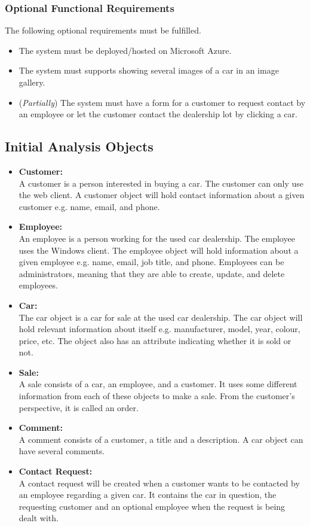 \subsubsection{Optional Functional Requirements}
The following optional requirements must be fulfilled.
\begin{itemize}
	\item The system must be deployed/hosted on Microsoft Azure.
	\item The system must supports showing several images of a car in an image gallery.
	\item (\textit{Partially}) The system must have a form for a customer to request contact by an employee or let the customer contact the dealership lot by clicking a car.
\end{itemize}

\subsection{Initial Analysis Objects}
\begin{itemize}
    \item \textbf{Customer:}\\
    A customer is a person interested in buying a car. The customer can only use the web client. A customer object will hold contact information about a given customer e.g. name, email, and phone.
    \item \textbf{Employee:}\\
    An employee is a person working for the used car dealership. The employee uses the Windows client. The employee object will hold information about a given employee e.g. name, email, job title, and phone. Employees can be administrators, meaning that they are able to create, update, and delete employees.
    \item \textbf{Car:}\\
    The car object is a car for sale at the used car dealership. The car object will hold relevant information about itself e.g. manufacturer, model, year, colour, price, etc. The object also has an attribute indicating whether it is sold or not.
    \item \textbf{Sale:}\\
    A sale consists of a car, an employee, and a customer. It uses some different information from each of these objects to make a sale. From the customer's perspective, it is called an order.
    \item \textbf{Comment:}\\
    A comment consists of a customer, a title and a description. A car object can have several comments.
    \item \textbf{Contact Request:}\\
    A contact request will be created when a customer wants to be contacted by an employee regarding a given car. It contains the car in question, the requesting customer and an optional employee when the request is being dealt with.
\end{itemize}
